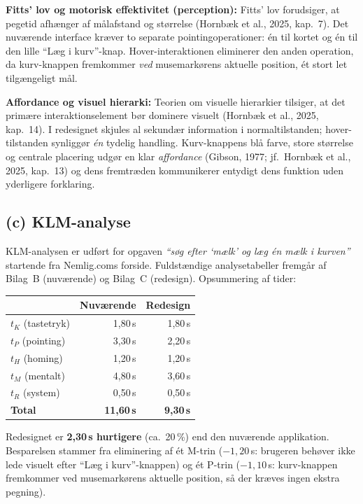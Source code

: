 \documentclass[12pt,a4paper]{article}
\begin{document}
\textbf{Fitts' lov og motorisk effektivitet (perception):}
Fitts' lov forudsiger, at pegetid afhænger af målafstand og størrelse
 (Hornbæk et al., 2025, kap.\ 7). Det nuværende interface kræver
to separate pointingoperationer: én til kortet og én til den lille ``Læg i kurv''-knap.
Hover-interaktionen eliminerer den anden operation, da kurv-knappen fremkommer \emph{ved}
musemarkørens aktuelle position, ét stort let tilgængeligt mål.

\textbf{Affordance og visuel hierarki:}
Teorien om visuelle hierarkier tilsiger, at det primære interaktionselement bør dominere
visuelt (Hornbæk et al., 2025, kap.\ 14). I redesignet skjules al sekundær information i
normaltilstanden; hover-tilstanden synliggør \emph{én} tydelig handling. Kurv-knappens
blå farve, store størrelse og centrale placering udgør en klar \emph{affordance}
(Gibson, 1977; jf.\ Hornbæk et al., 2025, kap.\ 13) og dens fremtræden kommunikerer
entydigt dens funktion uden yderligere forklaring.

\subsection*{(c) KLM-analyse}

KLM-analysen er udført for opgaven \emph{``søg efter `mælk' og læg én mælk i kurven''}
startende fra Nemlig.coms forside. Fuldstændige analysetabeller fremgår af Bilag~B
(nuværende) og Bilag~C (redesign). Opsummering af tider:

\begin{center}
\begin{tabular}{lrr}
\toprule
& \textbf{Nuværende} & \textbf{Redesign} \\
\midrule
$t_K$ (tastetryk)  & 1{,}80\,s & 1{,}80\,s \\
$t_P$ (pointing)   & 3{,}30\,s & 2{,}20\,s \\
$t_H$ (homing)     & 1{,}20\,s & 1{,}20\,s \\
$t_M$ (mentalt)    & 4{,}80\,s & 3{,}60\,s \\
$t_R$ (system)     & 0{,}50\,s & 0{,}50\,s \\
\midrule
\textbf{Total}     & \textbf{11{,}60\,s} & \textbf{9{,}30\,s} \\
\bottomrule
\end{tabular}
\end{center}

Redesignet er \textbf{2{,}30\,s hurtigere} (ca.\ 20\,\%) end den nuværende applikation.
Besparelsen stammer fra eliminering af ét M-trin ($-1{,}20$\,s: brugeren behøver ikke
lede visuelt efter ``Læg i kurv''-knappen) og ét P-trin ($-1{,}10$\,s: kurv-knappen
fremkommer ved musemarkørens aktuelle position, så der kræves ingen ekstra pegning).
\end{document}
